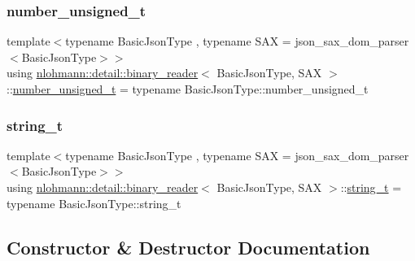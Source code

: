 \subsubsection{\texorpdfstring{number\_unsigned\_t}{number\_unsigned\_t}}
{\footnotesize\ttfamily template$<$typename Basic\+Json\+Type , typename S\+AX  = json\+\_\+sax\+\_\+dom\+\_\+parser$<$\+Basic\+Json\+Type$>$$>$ \\
using \mbox{\hyperlink{classnlohmann_1_1detail_1_1binary__reader}{nlohmann\+::detail\+::binary\+\_\+reader}}$<$ Basic\+Json\+Type, S\+AX $>$\+::\mbox{\hyperlink{classnlohmann_1_1detail_1_1binary__reader_a13bb5e2014c4cdf013d8715157cb456e}{number\+\_\+unsigned\+\_\+t}} =  typename Basic\+Json\+Type\+::number\+\_\+unsigned\+\_\+t\hspace{0.3cm}{\ttfamily [private]}}

\mbox{\label{classnlohmann_1_1detail_1_1binary__reader_aa0b9729917ca7ee6ed01e3792341316e}} 
\subsubsection{\texorpdfstring{string\_t}{string\_t}}
{\footnotesize\ttfamily template$<$typename Basic\+Json\+Type , typename S\+AX  = json\+\_\+sax\+\_\+dom\+\_\+parser$<$\+Basic\+Json\+Type$>$$>$ \\
using \mbox{\hyperlink{classnlohmann_1_1detail_1_1binary__reader}{nlohmann\+::detail\+::binary\+\_\+reader}}$<$ Basic\+Json\+Type, S\+AX $>$\+::\mbox{\hyperlink{classnlohmann_1_1detail_1_1binary__reader_aa0b9729917ca7ee6ed01e3792341316e}{string\+\_\+t}} =  typename Basic\+Json\+Type\+::string\+\_\+t\hspace{0.3cm}{\ttfamily [private]}}



\subsection{Constructor \& Destructor Documentation}
\mbox{\label{classnlohmann_1_1detail_1_1binary__reader_aed84f0302eb232d3b69f7653bef2337a}} 
